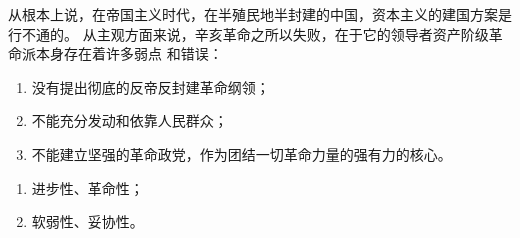 \documentclass[10pt, UTF8]{ctexbook} %
\begin{document}
\begin{mdframed}[frametitle={辛亥革命失败的原因和教训}]
    从根本上说，在帝国主义时代，在半殖民地半封建的中国，资本主义的建国方案是行不通的。
    从主观方面来说，辛亥革命之所以失败，在于它的领导者资产阶级革命派本身存在着许多弱点
    和错误：
\begin{enumerate}[itemsep=0pt]
    \item 没有提出彻底的反帝反封建革命纲领；
    \item 不能充分发动和依靠人民群众；
    \item 不能建立坚强的革命政党，作为团结一切革命力量的强有力的核心。
\end{enumerate}
\end{mdframed}

\begin{mdframed}[frametitle={民族资产阶级的两面性}]
    \begin{enumerate}[itemsep=0pt]
            \item 进步性、革命性；
            \item 软弱性、妥协性。
    \end{enumerate}
    \end{mdframed}




\end{document}

